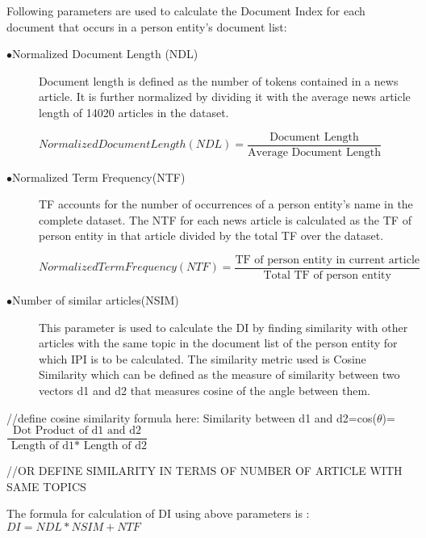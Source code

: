 Following parameters are used to calculate the Document Index for each document that occurs in a person entity's document list:

\begin{description}
\item[$\bullet$Normalized Document Length (NDL)]
Document length is defined as the number of tokens contained in a news article. It is further normalized by dividing it with the average news article length of 14020 articles in the dataset.

$Normalized Document Length (NDL)=\dfrac{\text{Document Length}} {\text{Average Document Length}}$



\item[$\bullet$Normalized Term Frequency(NTF)]
TF accounts for the number of occurrences of a person entity's name in the complete dataset. The NTF for each news article is calculated as the TF of person entity in that article divided by the total TF over the dataset.

$Normalized Term Frequency (NTF)=\dfrac{\text{TF of person entity in current article}} {\text{Total TF of person entity}}$


\item[$\bullet$Number of similar articles(NSIM)]
This parameter is used to calculate the DI by finding similarity with other articles with the same topic in the document list of the person entity for which IPI is to be calculated. The similarity metric used is Cosine Similarity which can be defined as the measure of similarity between two vectors d1 and d2 that measures cosine of the angle between them.


\end{description}

//define cosine similarity formula here:
Similarity between d1 and d2=cos($\theta$)= $\dfrac{\text{Dot Product of d1 and d2}} {\text{ Length of d1* Length of d2}}$

//OR DEFINE SIMILARITY IN TERMS OF NUMBER OF ARTICLE WITH SAME TOPICS

The formula for calculation of DI using above parameters is :
			$DI	=	NDL 	*	  NSIM		+	NTF$


